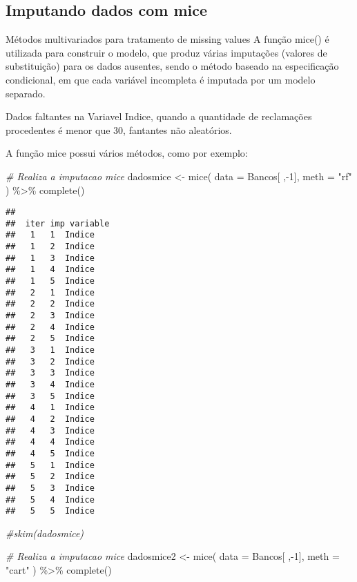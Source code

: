 \documentclass[
]{article}
\newenvironment{Shaded}{\begin{snugshade}}{\end{snugshade}}
\newcommand{\AttributeTok}[1]{\textcolor[rgb]{0.77,0.63,0.00}{#1}}
\newcommand{\CommentTok}[1]{\textcolor[rgb]{0.56,0.35,0.01}{\textit{#1}}}
\newcommand{\DecValTok}[1]{\textcolor[rgb]{0.00,0.00,0.81}{#1}}
\newcommand{\FunctionTok}[1]{\textcolor[rgb]{0.00,0.00,0.00}{#1}}
\newcommand{\NormalTok}[1]{#1}
\newcommand{\OtherTok}[1]{\textcolor[rgb]{0.56,0.35,0.01}{#1}}
\newcommand{\SpecialCharTok}[1]{\textcolor[rgb]{0.00,0.00,0.00}{#1}}
\newcommand{\StringTok}[1]{\textcolor[rgb]{0.31,0.60,0.02}{#1}}
\begin{document}
\hypertarget{imputando-dados-com-mice}{%
\subsection{Imputando dados com mice}\label{imputando-dados-com-mice}}

Métodos multivariados para tratamento de missing values A função mice()
é utilizada para construir o modelo, que produz várias imputações
(valores de substituição) para os dados ausentes, sendo o método baseado
na especificação condicional, em que cada variável incompleta é imputada
por um modelo separado.

Dados faltantes na Variavel Indice, quando a quantidade de reclamações
procedentes é menor que 30, fantantes não aleatórios.

A função mice possui vários métodos, como por exemplo:

\begin{Shaded}
\begin{Highlighting}[]
\CommentTok{\# Realiza a imputacao mice}
\NormalTok{dadosmice }\OtherTok{\textless{}{-}} \FunctionTok{mice}\NormalTok{(}
  \AttributeTok{data =}\NormalTok{ Bancos[ ,}\SpecialCharTok{{-}}\DecValTok{1}\NormalTok{],}
  \AttributeTok{meth =} \StringTok{"rf"}
\NormalTok{) }\SpecialCharTok{\%\textgreater{}\%} 
  \FunctionTok{complete}\NormalTok{() }
\end{Highlighting}
\end{Shaded}

\begin{verbatim}
## 
##  iter imp variable
##   1   1  Indice
##   1   2  Indice
##   1   3  Indice
##   1   4  Indice
##   1   5  Indice
##   2   1  Indice
##   2   2  Indice
##   2   3  Indice
##   2   4  Indice
##   2   5  Indice
##   3   1  Indice
##   3   2  Indice
##   3   3  Indice
##   3   4  Indice
##   3   5  Indice
##   4   1  Indice
##   4   2  Indice
##   4   3  Indice
##   4   4  Indice
##   4   5  Indice
##   5   1  Indice
##   5   2  Indice
##   5   3  Indice
##   5   4  Indice
##   5   5  Indice
\end{verbatim}

\begin{Shaded}
\begin{Highlighting}[]
\CommentTok{\#skim(dadosmice)}
\end{Highlighting}
\end{Shaded}

\begin{Shaded}
\begin{Highlighting}[]
\CommentTok{\# Realiza a imputacao mice}
\NormalTok{dadosmice2 }\OtherTok{\textless{}{-}} \FunctionTok{mice}\NormalTok{(}
  \AttributeTok{data =}\NormalTok{ Bancos[ ,}\SpecialCharTok{{-}}\DecValTok{1}\NormalTok{],}
  \AttributeTok{meth =} \StringTok{"cart"}
\NormalTok{) }\SpecialCharTok{\%\textgreater{}\%} 
  \FunctionTok{complete}\NormalTok{() }
\end{Highlighting}
\end{Shaded}
\end{document}
